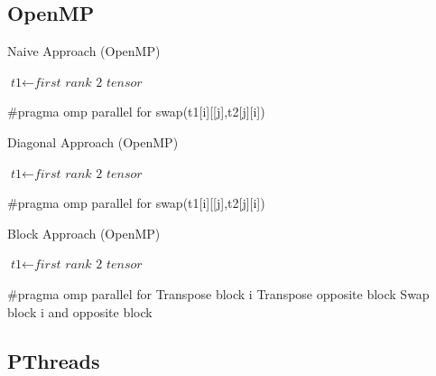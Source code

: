 \documentclass[journal,10pt]{IEEEtran}
\begin{document}
\clearpage

\subsection*{OpenMP}
\begin{algorithm}
\caption{Naive Approach (OpenMP)}\label{euclid}
\begin{algorithmic}[1]
\State $\textit{t1} \gets \textit{first rank 2 tensor}$

\State 	\#pragma omp parallel for
\State swap(t1[i][[j],t2[j][i])
\EndFor
\EndFor



\EndProcedure
\end{algorithmic}
\end{algorithm}



\begin{algorithm}
\caption{Diagonal Approach (OpenMP)}\label{euclid}
\begin{algorithmic}[1]
\State $\textit{t1} \gets \textit{first rank 2 tensor}$

\State \#pragma omp parallel for
\State swap(t1[i][[j],t2[j][i])
\EndFor
\EndFor



\EndProcedure
\end{algorithmic}
\end{algorithm}



\begin{algorithm}
\caption{Block Approach (OpenMP)}\label{euclid}
\begin{algorithmic}[1]
\State $\textit{t1} \gets \textit{first rank 2 tensor}$

\#pragma omp parallel for
\State Transpose block i
\State Transpose opposite block
\State Swap block i and opposite block
\EndFor



\EndProcedure
\end{algorithmic}
\end{algorithm}
\clearpage
\subsection*{PThreads}
\end{document}
